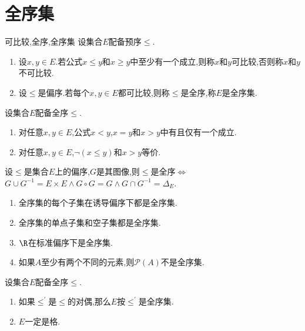 \section{全序集}

\begin{definition}{可比较,全序,全序集}{}
	设集合$E$配备预序$\leq$.
	\begin{enumerate}
		\item 设$x,y\in E$.若公式$x\leq y$和$x\geq y$中至少有一个成立,则称$x$和$y$可比较,否则称$x$和$y$不可比较.
		\item 设$\leq$是偏序.若每个$x,y\in E$都可比较,则称$\leq$是全序,称$E$是全序集.
	\end{enumerate}
\end{definition}

\begin{proposition}{}{}
	设集合$E$配备全序$\leq$.
	\begin{enumerate}
		\item 对任意$x,y\in E$,公式$x<y$,$x=y$和$x>y$中有且仅有一个成立.
		\item 对任意$x,y\in E$,$\neg\left(x\leq y\right)$和$x>y$等价.
	\end{enumerate}
\end{proposition}

\begin{proposition}{}{}
	设$\leq$是集合$E$上的偏序,$G$是其图像,则$\leq$是全序$\iff$ $G\cup G^{-1}=E\times E\wedge G\circ G=G\wedge G\cap G^{-1}=\Delta_{E}$.
\end{proposition}

\begin{example}{}{}
	\begin{enumerate}
		\item 全序集的每个子集在诱导偏序下都是全序集.
		\item 全序集的单点子集和空子集都是全序集.
		\item $\R$在标准偏序下是全序集.
		\item 如果$A$至少有两个不同的元素,则$\mathcal{P}\left(A\right)$不是全序集.
	\end{enumerate}
\end{example}

\begin{proposition}{}{}
	设集合$E$配备全序$\leq$.
	\begin{enumerate}
		\item 如果$\leq^{\prime}$是$\leq$的对偶,那么$E$按$\leq^{\prime}$是全序集.
		\item $E$一定是格.
	\end{enumerate}
\end{proposition}

